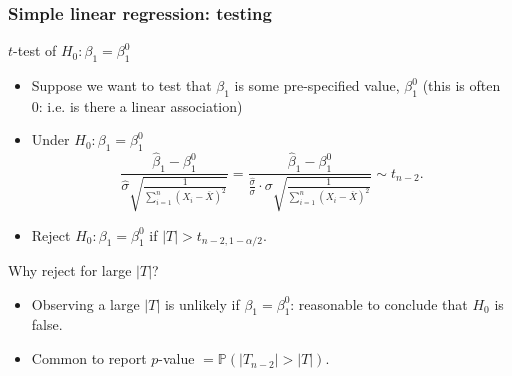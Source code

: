 \documentclass[handout]{beamer}
\newcommand{\Pp}{\mathbb{P}}
\begin{document}
   \begin{frame} \frametitle{Simple linear regression: testing}

   \begin{block}
   {$t$-test of $H_0:\beta_1=\beta_1^0$}
   \begin{itemize}[<+->]

   \item Suppose we want to test that $\beta_1$ is some pre-specified
   value, $\beta_1^0$ (this is often 0: i.e. is there a linear association)

   \item Under $H_0:\beta_1=\beta_1^0$
   $$\frac{\widehat{\beta}_1 - \beta^0_1}{\widehat{\sigma} \sqrt{\frac{1}{\sum_{i=1}^n(X_i-\overline{X})^2}}} = \frac{\widehat{\beta}_1 - \beta^0_1}{ \frac{\widehat{\sigma}}{\sigma}\cdot \sigma \sqrt{\frac{1}{\sum_{i=1}^n(X_i-\overline{X})^2}}} \sim t_{n-2}.$$


   \item Reject $H_0:\beta_1=\beta_1^0$ if $|T| > t_{n-2, 1-\alpha/2}$.

   \end{itemize}

   \end{block}

   \begin{block}
   {Why reject for large $|T|$?}

   \begin{itemize}[<+->]

   \item Observing a large $|T|$ is unlikely if $\beta_1 = \beta_1^0$: reasonable to conclude that $H_0$ is false.

   \item Common to report $p$-value $= \Pp(|T_{n-2}| > |T|).$

   \end{itemize}

   \end{block}
   \end{frame}

\end{document}
